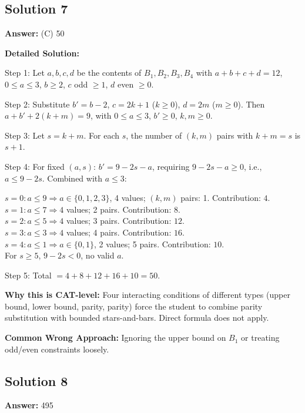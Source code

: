 \documentclass[11pt]{article}
\begin{document}
\subsection*{Solution 7}
\textbf{Answer:} (C) 50

\textbf{Detailed Solution:}

Step 1: Let \( a, b, c, d \) be the contents of \( B_1, B_2, B_3, B_4 \) with \( a + b + c + d = 12 \), \( 0 \le a \le 3 \), \( b \ge 2 \), \( c \) odd \( \ge 1 \), \( d \) even \( \ge 0 \).

Step 2: Substitute \( b' = b - 2 \), \( c = 2k+1 \) (\( k \ge 0 \)), \( d = 2m \) (\( m \ge 0 \)). Then \( a + b' + 2(k+m) = 9 \), with \( 0 \le a \le 3 \), \( b' \ge 0 \), \( k, m \ge 0 \).

Step 3: Let \( s = k + m \). For each \( s \), the number of \( (k, m) \) pairs with \( k + m = s \) is \( s + 1 \).

Step 4: For fixed \( (a, s) \): \( b' = 9 - 2s - a \), requiring \( 9 - 2s - a \ge 0 \), i.e., \( a \le 9 - 2s \). Combined with \( a \le 3 \):

\( s=0: a \le 9 \Rightarrow a \in \{0,1,2,3\} \), 4 values; \( (k,m) \) pairs: 1. Contribution: \( 4 \). \\
\( s=1: a \le 7 \Rightarrow 4 \) values; 2 pairs. Contribution: \( 8 \). \\
\( s=2: a \le 5 \Rightarrow 4 \) values; 3 pairs. Contribution: \( 12 \). \\
\( s=3: a \le 3 \Rightarrow 4 \) values; 4 pairs. Contribution: \( 16 \). \\
\( s=4: a \le 1 \Rightarrow a \in \{0,1\} \), 2 values; 5 pairs. Contribution: \( 10 \). \\
For \( s \ge 5 \), \( 9 - 2s < 0 \), no valid \( a \).

Step 5: Total \( = 4 + 8 + 12 + 16 + 10 = 50 \).

\textbf{Why this is CAT-level:} Four interacting conditions of different types (upper bound, lower bound, parity, parity) force the student to combine parity substitution with bounded stars-and-bars. Direct formula does not apply.

\textbf{Common Wrong Approach:} Ignoring the upper bound on \( B_1 \) or treating odd/even constraints loosely.

\subsection*{Solution 8}
\textbf{Answer:} 495
\end{document}
